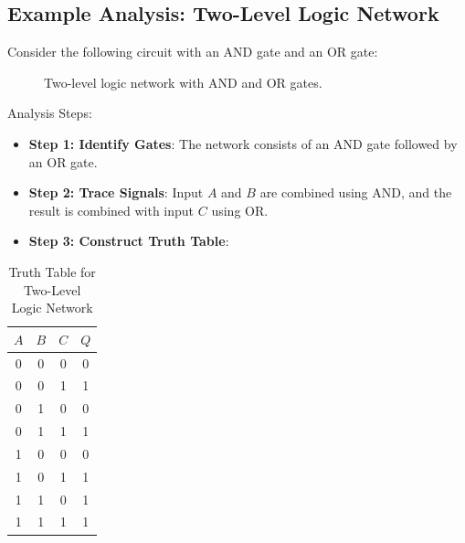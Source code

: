 \documentclass[twocolumn]{article}
\begin{document}
\subsection{Example Analysis: Two-Level Logic Network}
Consider the following circuit with an AND gate and an OR gate:
\begin{figure}[ht]
    \centering
    \caption{Two-level logic network with AND and OR gates.}
\end{figure}


\noindent Analysis Steps:
\begin{itemize}
    \item \textbf{Step 1: Identify Gates}: The network consists of an AND gate followed by an OR gate.
    \item \textbf{Step 2: Trace Signals}: Input $A$ and $B$ are combined using AND, and the result is combined with input $C$ using OR.
    \item \textbf{Step 3: Construct Truth Table}:
\end{itemize}
\begin{table}[h]
    \centering
    \begin{tabular}{|c|c|c|c|}
        \hline
        $A$ & $B$ & $C$ & $Q$ \\
        \hline
        0 & 0 & 0 & 0 \\
        0 & 0 & 1 & 1 \\
        0 & 1 & 0 & 0 \\
        0 & 1 & 1 & 1 \\
        1 & 0 & 0 & 0 \\
        1 & 0 & 1 & 1 \\
        1 & 1 & 0 & 1 \\
        1 & 1 & 1 & 1 \\
        \hline
    \end{tabular}
    \caption{Truth Table for Two-Level Logic Network}
\end{table}
\pagebreak
\end{document}
